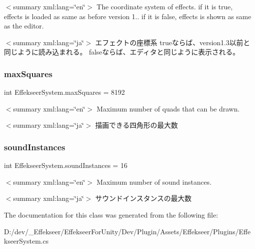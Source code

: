 $<$summary xml\+:lang=\char`\"{}en\char`\"{}$>$ The coordinate system of effects. if it is true, effects is loaded as same as before version 1.. if it is false, effects is shown as same as the editor. 

$<$summary xml\+:lang=\char`\"{}ja\char`\"{}$>$ エフェクトの座標系 trueならば、version1.3以前と同じように読み込まれる。 falseならば、エディタと同じように表示される。 \mbox{\label{class_effekseer_system_a2007e297eab6bc504cce40650679b1c4}} 
\subsubsection{\texorpdfstring{max\+Squares}{maxSquares}}
{\footnotesize\ttfamily int Effekseer\+System.\+max\+Squares = 8192}

$<$summary xml\+:lang=\char`\"{}en\char`\"{}$>$ Maximum number of quads that can be drawn. 

$<$summary xml\+:lang=\char`\"{}ja\char`\"{}$>$ 描画できる四角形の最大数 \mbox{\label{class_effekseer_system_ac83155c54d94fc6b61f6f53032923667}} 
\subsubsection{\texorpdfstring{sound\+Instances}{soundInstances}}
{\footnotesize\ttfamily int Effekseer\+System.\+sound\+Instances = 16}

$<$summary xml\+:lang=\char`\"{}en\char`\"{}$>$ Maximum number of sound instances. 

$<$summary xml\+:lang=\char`\"{}ja\char`\"{}$>$ サウンドインスタンスの最大数 

The documentation for this class was generated from the following file\+:\begin{DoxyCompactItemize}
\item 
D\+:/dev/\+\_\+\+Effekseer/\+Effekseer\+For\+Unity/\+Dev/\+Plugin/\+Assets/\+Effekseer/\+Plugins/Effekseer\+System.\+cs\end{DoxyCompactItemize}
